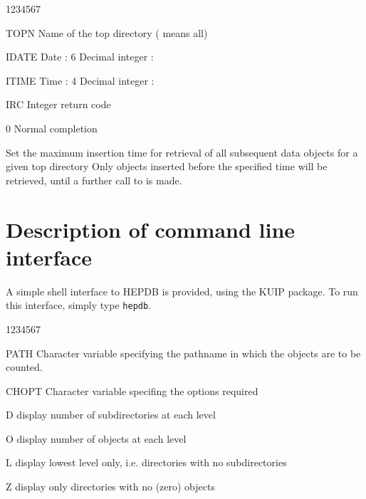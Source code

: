 
\begin{DLtt}{1234567}
\item[TOPN]Name of the top directory ( means all)
\item[IDATE]Date : 6 Decimal integer : 
\item[ITIME]Time : 4 Decimal integer : 
\item[IRC]Integer return code
  \begin{DLtt}{1}
    \item[0]Normal completion
  \end{DLtt}
\end{DLtt}

Set the maximum insertion time for retrieval of all subsequent
data objects for a given top directory
Only objects inserted before the specified time will be
retrieved, until a further call to  is made.


\chapter{Description of command line interface}
\let\condbreak\origcondbreak

A simple shell interface to HEPDB is provided, using the KUIP \cite{bib-KUIP}
package. To run this interface, simply type {\tt hepdb}.


\begin{DLtt}{1234567}
\item[PATH]Character variable specifying the pathname in which the objects
  are to be counted.
\item[CHOPT]Character variable specifing the options required
  \begin{DLtt}{1}
    \item[D]display number of subdirectories at each level
    \item[O]display number of objects at each level
    \item[L]display lowest level only, i.e. directories with no subdirectories
    \item[Z]display only directories with no (zero) objects
  \end{DLtt}
\end{DLtt}

